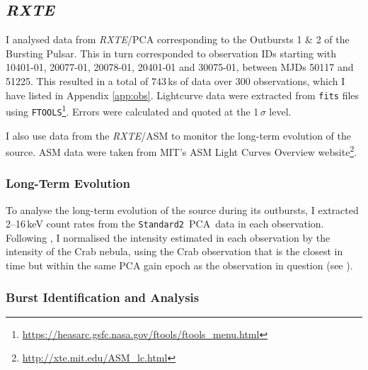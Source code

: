 \subsection{\textit{RXTE}}

\par I analysed data from \indexrxte\indexpca\textit{RXTE}/PCA corresponding to the Outbursts 1 \& 2 of the Bursting Pulsar.  This in turn corresponded to observation IDs starting with 10401-01, 20077-01, 20078-01, 20401-01 and 30075-01, between MJDs 50117 and 51225.  This resulted in a total of 743\,ks of data over 300 observations, which I have listed in Appendix \ref{app:obs}. Lightcurve data were extracted from \texttt{fits} files using \texttt{FTOOLS}\footnote{\url{https://heasarc.gsfc.nasa.gov/ftools/ftools_menu.html}}.  Errors were calculated and quoted at the 1$\,\sigma$ level.
\par I also use data from the \indexasm\textit{RXTE}/ASM to monitor the long-term evolution of the source.  ASM data were taken from MIT's ASM Light Curves Overview website\footnote{\url{http://xte.mit.edu/ASM_lc.html}}.

\subsubsection{Long-Term Evolution}

\par To analyse the long-term evolution of the source during its outbursts, I extracted 2--16\,keV count rates from the \texttt{Standard2}\indexstt\ PCA\indexpca\ data in each observation.  Following \citet{Altamirano_CrabNorm}, I normalised the intensity estimated in each observation by the intensity of the Crab nebula, using the Crab observation that is the closest in time but within the same PCA gain epoch as the observation in question (see \citealp{Jahoda_Calibrate}).

\subsubsection{Burst Identification and Analysis}

\label{sec:burst_diff}

